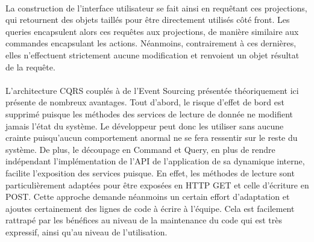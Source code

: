 \paragraph{}
La construction de l'interface utilisateur se fait ainsi en requêtant ces projections, qui retournent des objets taillés pour être directement utilisés côté front.
Les queries encapsulent alors ces requêtes aux projections, de manière similaire aux commandes encapsulant les actions.
Néanmoins, contrairement à ces dernières, elles n'effectuent strictement aucune modification et renvoient un objet résultat de la requête.
\paragraph{}
\label{par:Organisation conclusion}
L'architecture CQRS couplés à de l'Event Sourcing présentée théoriquement ici présente de nombreux avantages.
Tout d'abord, le risque d'effet de bord est supprimé puisque les méthodes des services de lecture de donnée ne modifient jamais l'état du système.
Le développeur peut donc les utiliser sans aucune crainte puisqu'aucun comportement anormal ne se fera ressentir sur le reste du système.
De plus, le découpage en Command et Query, en plus de rendre indépendant l'implémentation de l'API de l'application de sa dynamique interne, facilite l'exposition des services puisque.
En effet, les méthodes de lecture sont particulièrement adaptées pour être exposées en HTTP GET et celle d'écriture en POST.
Cette approche demande néanmoins un certain effort d'adaptation et ajoutes certainement des lignes de code à écrire à l'équipe.
Cela est facilement rattrapé par les bénéfices au niveau de la maintenance du code qui est très expressif, ainsi qu'au niveau de l'utilisation.

